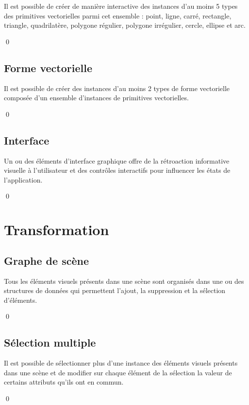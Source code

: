 \documentclass[12pt]{article}
\newcommand{\state}{\noindent}
\begin{document}
\state
Il est possible de créer de manière interactive des instances d'au moins 5 types des primitives vectorielles parmi cet ensemble : point, ligne, carré, rectangle, triangle, quadrilatère, polygone régulier, polygone irrégulier, cercle, ellipse et arc.

\qed

\subsection{Forme vectorielle}

\state
Il est possible de créer des instances d'au moins 2 types de forme vectorielle composée d'un ensemble d'instances de primitives vectorielles.

\qed

\subsection{Interface}

\state
Un ou des éléments d'interface graphique offre de la rétroaction informative visuelle à l'utilisateur et des contrôles interactifs pour influencer les états de l'application.

\qed

\pagebreak

\section{Transformation}

\subsection{Graphe de scène}

\state
Tous les éléments visuels présents dans une scène sont organisés dans une ou des structures de données qui permettent l'ajout, la suppression et la sélection d'éléments.

\qed

\subsection{Sélection multiple}

\state
Il est possible de sélectionner plus d'une instance des éléments visuels
présents dans une scène et de modifier sur chaque élément de la sélection la valeur de certains attributs qu'ils ont en commun.

\qed
\end{document}
